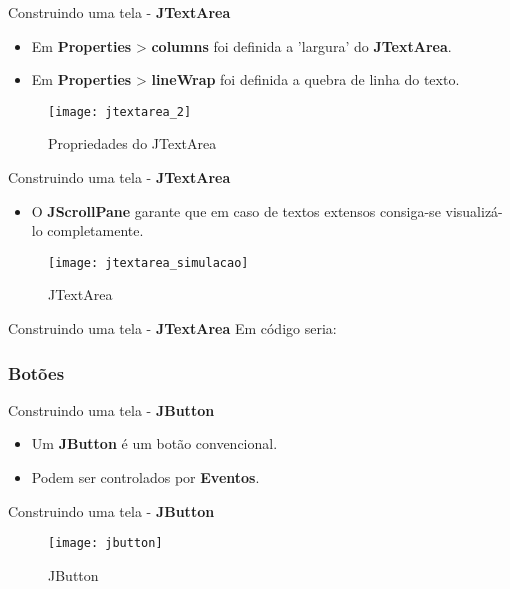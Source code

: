 \documentclass[10pt]{beamer}
\begin{document}
\begin{frame}{Construindo uma tela - \textbf{JTextArea}}
\begin{itemize}
\item Em \textbf{Properties} > \textbf{columns} foi definida a 'largura' do \textbf{JTextArea}.
\item Em \textbf{Properties} > \textbf{lineWrap} foi definida a quebra de linha do texto.
\end{itemize}
\begin{figure}[!htb]
    \centering
    \texttt{[image: jtextarea\_2]}
    \caption{Propriedades do JTextArea}
    \label{figRotulo}
  \end{figure}
\end{frame}{}


\begin{frame}{Construindo uma tela - \textbf{JTextArea}}
\begin{itemize}
\item O \textbf{JScrollPane} garante que em caso de textos extensos consiga-se visualizá-lo completamente.
\end{itemize}
\begin{figure}[!htb]
    \centering
    \texttt{[image: jtextarea\_simulacao]}
    \caption{JTextArea}
    \label{figRotulo}
  \end{figure}
\end{frame}{}



\begin{frame}{Construindo uma tela - \textbf{JTextArea}}
Em código seria:

\end{frame}{}

\subsubsection{Botões}
\begin{frame}{Construindo uma tela - \textbf{JButton}}
\begin{itemize}
\item Um \textbf{JButton} é um botão convencional.
\item Podem ser controlados por \textbf{Eventos}.
\end{itemize}
\end{frame}{}

\begin{frame}{Construindo uma tela - \textbf{JButton}}
\begin{figure}[!htb]
    \centering
    \texttt{[image: jbutton]}
    \caption{JButton}
    \label{figRotulo}
  \end{figure}
\end{frame}{}
\end{document}

